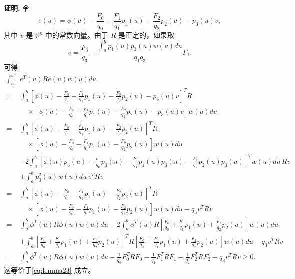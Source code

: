 \documentclass[a4paper, 12pt, oneside]{article}
\theoremstyle{cn_theorem}
\begin{document}
\textbf{\heiti 证明.} 令
\begin{equation*}
    e(u) = \phi(u) - \frac{F_0}{q_0} - \frac{F_1}{q_1} p_1(u) - \frac{F_2}{q_2} p_2(u) - p_3(u) v,
\end{equation*}
其中 $v$ 是 $\mathbb{R}^n$ 中的常数向量。由于 $R$ 是正定的，如果取
\begin{equation*}
    v = \frac{F_3}{q_3} - \frac{\int_a^b p_1(u) p_3(u) w(u) du}{q_1 q_3} F_1.
\end{equation*}
可得
\begin{align*}
    \int_a^b & e^T(u) R e(u) w(u) du \\
    =& \int_a^b \left[ \phi(u) - \frac{F_0}{q_0} - \frac{F_1}{q_1} p_1(u) - \frac{F_2}{q_2} p_2(u) - p_3(u) v \right]^T R \\
    & \quad \times \left[ \phi(u) - \frac{F_0}{q_0} - \frac{F_1}{q_1} p_1(u) - \frac{F_2}{q_2} p_2(u) - p_3(u) v \right] w(u) du \\
    =& \int_a^b \left[ \phi(u) - \frac{F_0}{q_0} - \frac{F_1}{q_1} p_1(u) - \frac{F_2}{q_2} p_2(u) \right]^T R \\
    & \quad \times \left[ \phi(u) - \frac{F_0}{q_0} - \frac{F_1}{q_1} p_1(u) - \frac{F_2}{q_2} p_2(u) \right] w(u) du \\
    & - 2 \int_a^b \left[ \phi(u) p_3(u) - \frac{F_0}{q_0} p_3(u) - \frac{F_1}{q_1} p_1(u) p_3(u) - \frac{F_2}{q_2} p_2(u) p_3(u) \right]^T w(u) du \, R v \\
    & + \int_a^b p_3^2(u) w(u) du \, v^T R v \\
    =& \int_a^b \left[ \phi(u) - \frac{F_0}{q_0} - \frac{F_1}{q_1} p_1(u) - \frac{F_2}{q_2} p_2(u) \right]^T R \\
    & \quad \times \left[ \phi(u) - \frac{F_0}{q_0} - \frac{F_1}{q_1} p_1(u) - \frac{F_2}{q_2} p_2(u) \right] w(u) du - q_3 v^T R v \\
    =& \int_a^b \phi^T(u) R \phi(u) w(u) du - 2 \int_a^b \phi^T(u) R \left[ \frac{F_0}{q_0} + \frac{F_1}{q_1} p_1(u) + \frac{F_2}{q_2} p_2(u) \right] w(u) du \\
    & + \int_a^b \left[ \frac{F_0}{q_0} + \frac{F_1}{q_1} p_1(u) + \frac{F_2}{q_2} p_2(u) \right]^T R \left[ \frac{F_0}{q_0} + \frac{F_1}{q_1} p_1(u) + \frac{F_2}{q_2} p_2(u) \right] w(u) du - q_3 v^T R v \\
    =& \int_a^b \phi^T(u) R \phi(u) w(u) du - \frac{1}{q_0} F_0^T R F_0 - \frac{1}{q_1} F_1^T R F_1 - \frac{1}{q_2} F_2^T R F_2 - q_3 v^T R v \ge 0.
\end{align*}
这等价于\eqref{eq:lemma23} 成立。
\end{document}
